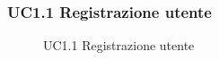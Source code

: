 \subsubsection{UC1.1 Registrazione utente}
\begin{figure}[H]
\centering
\noindent{}
\caption{UC1.1 Registrazione utente}
\end{figure}
